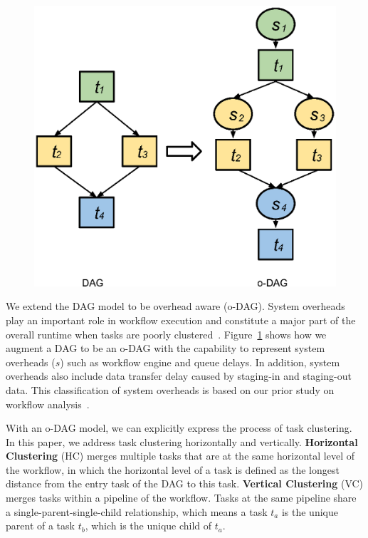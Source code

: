 \documentclass{IOS-Book-Article}
\begin{document}
\begin{figure}[!htb]
	\centering
	\includegraphics[width=0.7\linewidth]{figure1.eps}
	\label{fig:model_odag}
\end{figure}

We extend the DAG model to be overhead aware (o-DAG). System overheads play an important role in workflow execution and constitute a major part of the overall runtime when tasks are poorly clustered~\cite{Chen2011}. Figure~\ref{fig:model_odag} shows how we augment a DAG to be an o-DAG with the capability to represent system overheads ($s$) such as workflow engine and queue delays. In addition, system overheads also include data transfer delay caused by staging-in and staging-out data. This classification of system overheads is based on our prior study on workflow analysis~\cite{Chen2011}. 

With an o-DAG model, we can explicitly express the process of task clustering. In this paper, we address task clustering horizontally and vertically. \textbf{Horizontal Clustering} (HC) merges multiple tasks that are at the same horizontal level of the workflow, in which the horizontal level of a task is defined as the longest distance from the entry task of the DAG to this task. \textbf{Vertical Clustering} (VC) merges tasks within a pipeline of the workflow. Tasks at the same pipeline share a single-parent-single-child relationship, which means a task $t_a$ is the unique parent of a task $t_b$, which is the unique child of $t_a$. 
\end{document}
